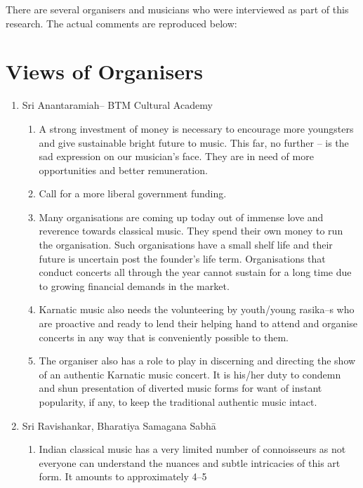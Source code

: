 There are several organisers and musicians who were interviewed as part of this research. The actual comments are reproduced below:


\section*{Views of Organisers}

\begin{enumerate}
\itemsep=0pt
\item Sri Anantaramiah– BTM Cultural Academy
 
\begin{enumerate}
\itemsep=0pt
\item A strong investment of money is necessary to encourage more youngsters and give sustainable bright future to music. This far, no further – is the sad expression on our musician’s face. They are in need of more opportunities and better remuneration.

 \item Call for a more liberal government funding.

 \item Many organisations are coming up today out of immense love and reverence towards classical music. They spend their own money to run the organisation. Such organisations have a small shelf life and their future is uncertain post the founder’s life term. Organisations that conduct concerts all through the year cannot sustain for a long time due to growing financial demands in the market.

 \item Karnatic music also needs the volunteering by youth/young rasika–s who are proactive and ready to lend their helping hand to attend and organise concerts in any way that is conveniently possible to them.

 \item The organiser also has a role to play in discerning and directing the show of an authentic Karnatic music concert. It is his/her duty to condemn and shun presentation of diverted music forms for want of instant popularity, if any, to keep the traditional authentic music intact.
\end{enumerate}

 \item Sri Ravishankar, Bharatiya Samagana Sabhā
 
\begin{enumerate}
\itemsep=0pt
\item Indian classical music has a very limited number of connoisseurs as not everyone can understand the nuances and subtle intricacies of this art form. It amounts to approximately 4–5\\%


\end{enumerate}
\end{enumerate}
